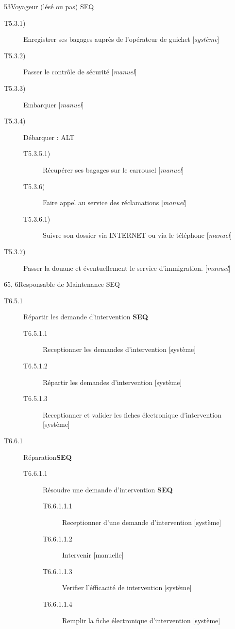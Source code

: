 {\begin{description}
\dta
{5}{3}{Voyageur (lésé ou pas)}
{SEQ}
{
\begin{description}
	\item [T5.3.1)] Enregistrer ses bagages auprès de l'opérateur de guichet [\textsl{système}]
	\item [T5.3.2)] Passer le contrôle de sécurité [\textsl{manuel}]
	\item [T5.3.3)] Embarquer [\textsl{manuel}]
	\item [T5.3.4)] Débarquer : ALT
	\begin{description}
		\item [T5.3.5.1)] Récupérer ses bagages sur le carrousel [\textsl{manuel}]
		\item [T5.3.6)] Faire appel au service des réclamations [\textsl{manuel}]
		\item [T5.3.6.1)] Suivre son dossier via INTERNET ou via le téléphone [\textsl{manuel}]
	\end{description}
	\item [T5.3.7)] Passer la douane et éventuellement le service d'immigration. [\textsl{manuel}]
\end{description}
}

\dta
{6}{5, 6}{Responsable de Maintenance}
{SEQ}
{
\begin{description}
	\item[T6.5.1] Répartir les demande d'intervention \textbf{SEQ}
	\begin{description}
		\item[T6.5.1.1] Receptionner les demandes d'intervention [système]
		\item[T6.5.1.2] Répartir les demandes d'intervention [système]
		\item[T6.5.1.3] Receptionner et valider les fiches électronique d'intervention [système]
	\end{description}

	\item[T6.6.1] Réparation\textbf{SEQ}
	\begin{description}
		\item[T6.6.1.1] Résoudre une demande d'intervention \textbf{SEQ}
		\begin{description}
			\item[T6.6.1.1.1] Receptionner d'une demande d'intervention [système]
			\item[T6.6.1.1.2] Intervenir [manuelle]
			\item[T6.6.1.1.3] Verifier l'éfficacité de intervention [système]
			\item[T6.6.1.1.4] Remplir la fiche électronique d'intervention [système]
		\end{description}
	\end{description}
\end{description}
}


\end{description}}
